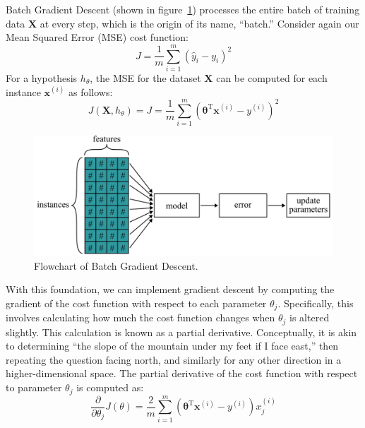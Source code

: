 \documentclass[12pt,letter]{article}
\begin{document}
Batch Gradient Descent (shown in figure~\ref{fig:gradient_descent_batch}) processes the entire batch of training data $\textbf{X}$ at every step, which is the origin of its name, ``batch.'' Consider again our Mean Squared Error (MSE) cost function:
\begin{equation}
J = \frac{1}{m} \sum_{i=1}^{m} (\hat{y}_i - y_i)^2
\end{equation}
For a hypothesis $h_\theta$, the MSE for the dataset $\textbf{X}$ can be computed for each instance $\textbf{x}^{(i)}$ as follows:
\begin{equation}
J(\textbf{X}, h_\theta) = J = \frac{1}{m} \sum_{i=1}^{m} (\pmb{\theta}^\text{T}\textbf{x}^{(i)} - y^{(i)})^2
\end{equation}

\begin{figure}[h]
	\centering
	\includegraphics[width=5.3in]{../figures/gradient_descent_batch}
	\caption{Flowchart of Batch Gradient Descent.}
	\label{fig:gradient_descent_batch}
\end{figure}


With this foundation, we can implement gradient descent by computing the gradient of the cost function with respect to each parameter $\theta_j$. Specifically, this involves calculating how much the cost function changes when $\theta_j$ is altered slightly. This calculation is known as a partial derivative. Conceptually, it is akin to determining ``the slope of the mountain under my feet if I face east,'' then repeating the question facing north, and similarly for any other direction in a higher-dimensional space. The partial derivative of the cost function with respect to parameter $\theta_j$ is computed as:
\begin{equation}
\frac{\partial}{\partial \theta_j} J(\theta) = \frac{2}{m} \sum_{i=1}^{m}(\pmb{\theta}^\text{T}\textbf{x}^{(i)} - y^{(i)}) x_j^{(i)}
\label{eq:pd_cost_function}
\end{equation}
\end{document}
